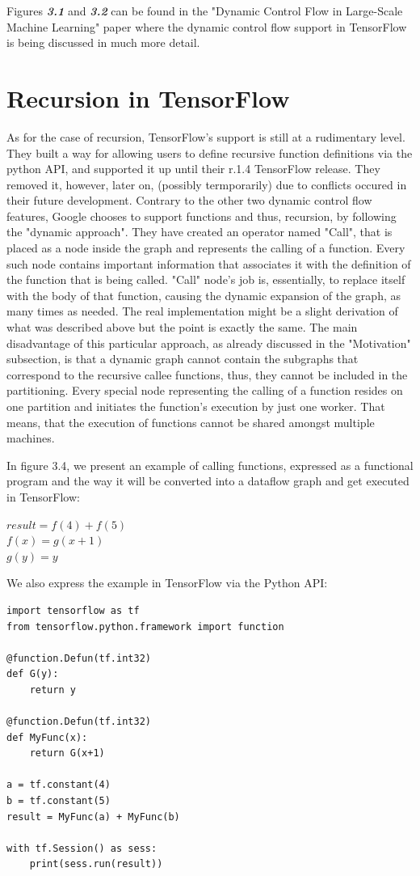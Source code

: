 \documentclass[ack,preface]{dithesis}
\begin{document}
Figures \textit{\textbf{3.1}} and \textit{\textbf{3.2}}  can be found in the "Dynamic Control Flow in Large-Scale Machine Learning" paper  \cite{Yu:2018} where the dynamic control flow support in TensorFlow is being discussed in much more detail. 

\section{Recursion in TensorFlow}
As for the case of recursion, TensorFlow's support is still at a rudimentary level. They built a way for allowing users to define recursive function definitions via the python API,  and supported it up until their r.1.4 TensorFlow release. They removed it, however, later on, (possibly termporarily) due to conflicts occured in their future development. Contrary to the other two dynamic control flow features, Google chooses to support functions and thus, recursion, by following the "dynamic approach".  They have created an operator named "Call", that is placed as a node inside the graph and represents the calling of a function. Every such node contains important information that associates it with the definition  of the function that is being called.  "Call" node's job is, essentially,  to replace itself with the body of that function, causing the dynamic expansion of the graph, as many times as needed. The real implementation might be a slight derivation of what was described above but the point is exactly the same.
The main disadvantage of this particular approach, as already discussed in the "Motivation" subsection, is that a dynamic graph  cannot contain the subgraphs that correspond to the recursive callee functions, thus, they cannot be included in the partitioning. Every special node representing the calling of a function resides on one partition and initiates the function's execution by just one worker. That means, that the execution of functions cannot be shared amongst multiple machines.

\begin{flushleft}
  In figure 3.4, we present an example of calling functions, expressed as a functional program and the way it will be converted into a dataflow graph and get executed in TensorFlow:

 \setlength{\parindent}{25ex} $result = f(4) + f(5)$ \\
$f(x) = g(x+1)$ \\ 
$g(y) = y$
\end{flushleft}

We also express the example in TensorFlow via the Python API:
\begin{lstlisting}
import tensorflow as tf
from tensorflow.python.framework import function

@function.Defun(tf.int32)
def G(y):
	return y

@function.Defun(tf.int32)
def MyFunc(x):
	return G(x+1)

a = tf.constant(4)
b = tf.constant(5)
result = MyFunc(a) + MyFunc(b)

with tf.Session() as sess:
	print(sess.run(result))
\end{lstlisting}
\end{document}

